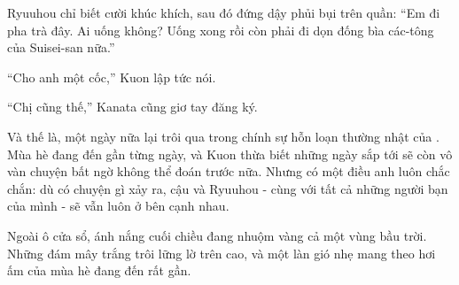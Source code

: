 \documentclass[../main.tex]{subfiles}
\begin{document}
Ryuuhou chỉ biết cười khúc khích, sau đó đứng dậy phủi bụi trên quần: ``Em đi pha trà đây. Ai uống không? Uống xong rồi còn phải đi dọn đống bìa các-tông của Suisei-san nữa.''

``Cho anh một cốc,'' Kuon lập tức nói.

``Chị cũng thế,'' Kanata cũng giơ tay đăng ký.

Và thế là, một ngày nữa lại trôi qua trong chính sự hỗn loạn thường nhật của \hll. Mùa hè đang đến gần từng ngày, và Kuon thừa biết những ngày sắp tới sẽ còn vô vàn chuyện bất ngờ không thể đoán trước nữa. Nhưng có một điều anh luôn chắc chắn: dù có chuyện gì xảy ra, cậu và Ryuuhou - cùng với tất cả những người bạn của mình - sẽ vẫn luôn ở bên cạnh nhau.

Ngoài ô cửa sổ, ánh nắng cuối chiều đang nhuộm vàng cả một vùng bầu trời. Những đám mây trắng trôi lững lờ trên cao, và một làn gió nhẹ mang theo hơi ấm của mùa hè đang đến rất gần.
\end{document}
